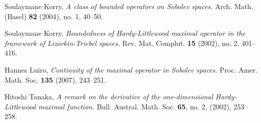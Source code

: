 \documentclass[12pt]{amsart}
\numberwithin{equation}{section}
\theoremstyle{plain}
\theoremstyle{definition}
\theoremstyle{remark}
\begin{document}
\begin{thebibliography}{99}
 Soulaymane Korry,
{\em A class of bounded operators on Sobolev spaces.}
 Arch. Math. (Basel)  {\bf 82} (2004), no. 1, 40--50.

 Soulaymane Korry,
{\em Boundedness of Hardy-Littlewood maximal operator in the
framework
    of Lizorkin-Triebel spaces.}
Rev. Mat. Complut.   {\bf 15} (2002), no. 2, 401--416.

 Hannes Luiro,
{\em Continuity of the maximal operator in Sobolev spaces.}  Proc.
Amer. Math. Soc. {\bf 135} (2007), 243--251.

 Hitoshi Tanaka,
{\em A remark on the derivative of the one-dimensional
Hardy-Littlewood
    maximal function.}
Bull. Austral. Math. Soc.  {\bf 65}, no. 2, (2002), 253--258.

\end{thebibliography}
\end{document}
